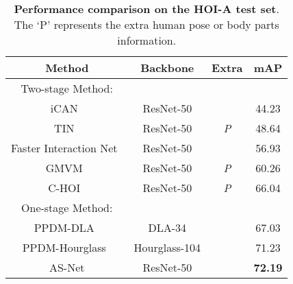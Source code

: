 \documentclass[final]{cvpr}
\newcommand{\xmark}{\ding{55}}\newcommand{\cmark}{\ding{51}}
\begin{document}
\begin{table}[htb!]
  \begin{center}
  \small
  \begin{tabular}{cccc}
  \hline
  Method    &Backbone      &Extra  &mAP\\
  \hline\hline
  Two-stage Method:     &               &                       & \\
  iCAN~\cite{gao2018ican}	        &ResNet-50		&\xmark				    &44.23\\
  TIN~\cite{li2018transferable} &ResNet-50   &\emph{P}   & 48.64\\
  Faster Interaction Net~\cite{picleadboard}       &ResNet-50      &\xmark    &56.93\\
  GMVM~\cite{picleadboard}       &ResNet-50      &\emph{P}    &60.26\\
  C-HOI~\cite{zhou2020cascaded}       &ResNet-50      &\emph{P}   &66.04\\
  \hline 
  One-stage Method:     &               &                       &\\
  PPDM-DLA~\cite{liao2020ppdm}		&DLA-34	&\xmark	&67.03\\
  PPDM-Hourglass~\cite{liao2020ppdm}		&Hourglass-104	&\xmark	&71.23\\
  \cellcolor{mygray-bg}AS-Net			&\cellcolor{mygray-bg}ResNet-50  	&\cellcolor{mygray-bg}\xmark			        &\cellcolor{mygray-bg}\textbf{72.19}\\
  \hline
  \end{tabular}
  \end{center}
  \vspace{-2mm}
    \caption{\textbf{Performance comparison on the HOI-A test set}. The `P' represents the extra human pose or body parts information.}
  \label{tb:hoia}
\end{table}
\end{document}
